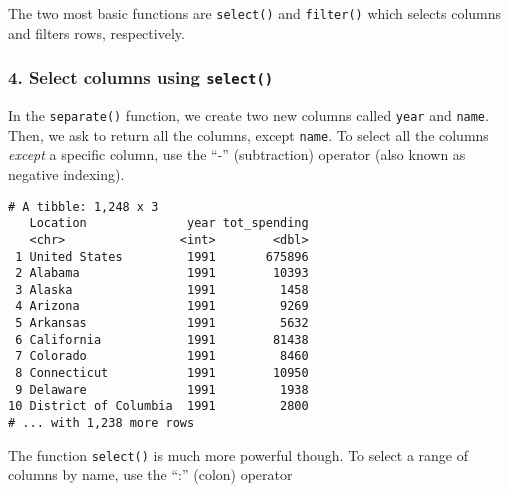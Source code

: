 \documentclass[]{article}
\newenvironment{Shaded}{\begin{snugshade}}{\end{snugshade}}
\newcommand{\DataTypeTok}[1]{\textcolor[rgb]{0.13,0.29,0.53}{#1}}
\newcommand{\KeywordTok}[1]{\textcolor[rgb]{0.13,0.29,0.53}{\textbf{#1}}}
\newcommand{\NormalTok}[1]{#1}
\newcommand{\OperatorTok}[1]{\textcolor[rgb]{0.81,0.36,0.00}{\textbf{#1}}}
\newcommand{\OtherTok}[1]{\textcolor[rgb]{0.56,0.35,0.01}{#1}}
\newcommand{\StringTok}[1]{\textcolor[rgb]{0.31,0.60,0.02}{#1}}
\begin{document}
The two most basic functions are \texttt{select()} and \texttt{filter()}
which selects columns and filters rows, respectively.

\hypertarget{select-columns-using-select}{%
\subsubsection{\texorpdfstring{4. Select columns using
\texttt{select()}}{4. Select columns using select()}}\label{select-columns-using-select}}

In the \texttt{separate()} function, we create two new columns called
\texttt{year} and \texttt{name}. Then, we ask to return all the columns,
except \texttt{name}. To select all the columns \emph{except} a specific
column, use the ``-'' (subtraction) operator (also known as negative
indexing).

\begin{Shaded}
\end{Shaded}

\begin{verbatim}
# A tibble: 1,248 x 3
   Location              year tot_spending
   <chr>                <int>        <dbl>
 1 United States         1991       675896
 2 Alabama               1991        10393
 3 Alaska                1991         1458
 4 Arizona               1991         9269
 5 Arkansas              1991         5632
 6 California            1991        81438
 7 Colorado              1991         8460
 8 Connecticut           1991        10950
 9 Delaware              1991         1938
10 District of Columbia  1991         2800
# ... with 1,238 more rows
\end{verbatim}

The function \texttt{select()} is much more powerful though. To select a
range of columns by name, use the ``:'' (colon) operator

\begin{Shaded}
\end{Shaded}
\end{document}
